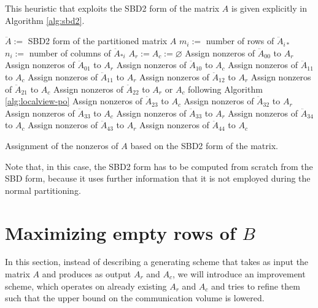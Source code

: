 This heuristic that exploits the SBD2 form of the matrix $A$ is given explicitly in Algorithm \ref{alg:sbd2}.

\begin{algorithm}[h]
	\begin{algorithmic}
		\State
		\State $\ddot{A}:=$ SBD2 form of the partitioned matrix $A$
		\State $m_i := $ number of rows of $\ddot{A}_{i*}$
		\State $n_i := $ number of columns of $\ddot{A}_{*i}$
		\State $A_r := A_c := \varnothing$
		\State Assign nonzeros of $\ddot{A}_{00}$ to $A_r$
		\State Assign nonzeros of $\ddot{A}_{01}$ to $A_r$
		\State Assign nonzeros of $\ddot{A}_{10}$ to $A_c$
		\State Assign nonzeros of $\ddot{A}_{11}$ to $A_c$
		\Else
		\State Assign nonzeros of $\ddot{A}_{11}$ to $A_r$
		\EndIf
		\State Assign nonzeros of $\ddot{A}_{12}$ to $A_r$
		\State Assign nonzeros of $\ddot{A}_{21}$ to $A_c$
		\State Assign nonzeros of $\ddot{A}_{22}$ to $A_r$ or $A_c$ following Algorithm \ref{alg:localview-po}
		\State Assign nonzeros of $\ddot{A}_{23}$ to $A_c$
		\State Assign nonzeros of $\ddot{A}_{32}$ to $A_r$
		\State Assign nonzeros of $\ddot{A}_{33}$ to $A_c$
		\Else
		\State Assign nonzeros of $\ddot{A}_{33}$ to $A_r$
		\EndIf
		\State Assign nonzeros of $\ddot{A}_{34}$ to $A_c$
		\State Assign nonzeros of $\ddot{A}_{43}$ to $A_r$
		\State Assign nonzeros of $\ddot{A}_{44}$ to $A_c$
	\end{algorithmic}
	\caption{Assignment of the nonzeros of $A$ based on the SBD2 form of the matrix.}
\end{algorithm}

Note that, in this case, the SBD2 form has to be computed from scratch from the SBD form, because it uses further information that it is not employed during the normal partitioning.


\section{Maximizing empty rows of $B$} \label{sec:globalview}

In this section, instead of describing a generating scheme that takes as input the matrix $A$ and produces as output $A_r$ and $A_c$, we will introduce an improvement scheme, which operates on already existing $A_r$ and $A_c$ and tries to refine them such that the upper bound on the communication volume is lowered.

